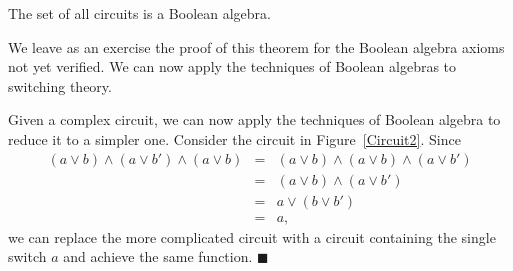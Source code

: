 \begin{theorem}
The set of all circuits is a Boolean algebra.
\end{theorem}
 
 
We leave as an exercise the proof of this theorem for the Boolean
algebra axioms not yet verified. We can now apply the techniques of
Boolean algebras to switching theory. 
 
 
\medskip
 
 
Given a complex circuit, we can now apply the techniques of
Boolean algebra to reduce it to a simpler one. Consider the circuit in 
Figure~\ref{Circuit2}. Since 
\begin{eqnarray*}
(a \vee b) \wedge (a \vee b') \wedge (a \vee b)
& = &
(a \vee b) \wedge (a \vee b) \wedge (a \vee b') \\
& = &
(a \vee b) \wedge (a \vee b') \\
& = &
a \vee ( b \vee b') \\
& = &
a,
\end{eqnarray*}
we can replace the more complicated circuit with a circuit containing
the single switch $a$ and achieve the same function.
\hspace{\fill} $\blacksquare$
 
 
 

 
\histhead
 
